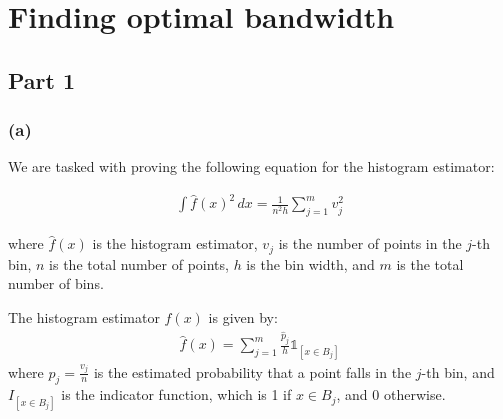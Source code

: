 \section{Finding optimal bandwidth}

\subsection{Part 1}
\subsubsection{(a)}
We are tasked with proving the following equation for the histogram estimator:

\begin{align}
	\int \hat{f}(x)^2 \, dx = \frac{1}{n^2 h} \sum_{j=1}^{m} v_j^2
\end{align}

where \( \hat{f}(x) \) is the histogram estimator, \( v_j \) is the number of
points in the \( j \)-th bin, \( n \) is the total number of points, \( h \) is
the bin width, and \( m \) is the total number of bins.

The histogram estimator \( \hat{f}(x) \) is given by:
\begin{align}
	\hat{f}(x) = \sum_{j=1}^{m} \frac{\hat{p}_j}{h} \mathbb{1}_{[x \in B_j]}
\end{align}
where $\hat{p}_j = \frac{v_j}{n}$ is the estimated probability that a point
falls in the $j$-th bin, and $I_{[x \in B_j]}$ is the indicator
function, which is 1 if $x \in B_j$, and 0 otherwise.

